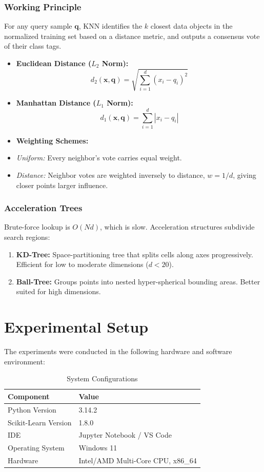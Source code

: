 \documentclass[12pt,a4paper]{article}
\begin{document}
\subsubsection{Working Principle}
For any query sample $\mathbf{q}$, KNN identifies the $k$ closest data objects in the normalized training set based on a distance metric, and outputs a consensus vote of their class tags.
\begin{itemize}
    \item \textbf{Euclidean Distance ($L_2$ Norm):}
    \begin{equation}
        d_2(\mathbf{x}, \mathbf{q}) = \sqrt{\sum_{i=1}^{d} (x_i - q_i)^2}
    \end{equation}
    \item \textbf{Manhattan Distance ($L_1$ Norm):}
    \begin{equation}
        d_1(\mathbf{x}, \mathbf{q}) = \sum_{i=1}^{d} |x_i - q_i|
    \end{equation}
    \item \textbf{Weighting Schemes:}
    \item \textit{Uniform:} Every neighbor's vote carries equal weight.
    \item \textit{Distance:} Neighbor votes are weighted inversely to distance, $w = 1/d$, giving closer points larger influence.
\end{itemize}

\subsubsection{Acceleration Trees}
Brute-force lookup is $O(Nd)$, which is slow. Acceleration structures subdivide search regions:
\begin{enumerate}
    \item \textbf{KD-Tree:} Space-partitioning tree that splits cells along axes progressively. Efficient for low to moderate dimensions ($d < 20$).
    \item \textbf{Ball-Tree:} Groups points into nested hyper-spherical bounding areas. Better suited for high dimensions.
\end{enumerate}

\section{Experimental Setup}
The experiments were conducted in the following hardware and software environment:

\begin{table}[!ht]
\centering
\begin{tabular}{|l|l|}
\hline
Component & Value \\
\hline
Python Version & 3.14.2 \\
Scikit-Learn Version & 1.8.0 \\
IDE & Jupyter Notebook / VS Code \\
Operating System & Windows 11 \\
Hardware & Intel/AMD Multi-Core CPU, x86\_64 \\
\hline
\end{tabular}
\caption{System Configurations}
\label{tab:system}
\end{table}
\end{document}
